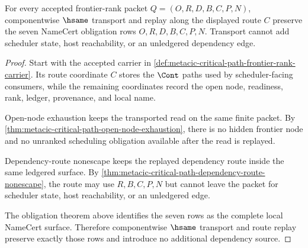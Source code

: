 \begin{theorem}
\label{thm:metacic-critical-path-frontier-rank-transport-stability}
For every accepted frontier-rank packet $Q=(O,R,D,B,C,P,N)$, componentwise $\hsame$ transport and replay along the displayed route $C$ preserve the seven NameCert obligation rows $O,R,D,B,C,P,N$. Transport cannot add scheduler state, host reachability, or an unledgered dependency edge.
\end{theorem}
\begin{proof}
Start with the accepted carrier in \autoref{def:metacic-critical-path-frontier-rank-carrier}. Its route coordinate $C$ stores the $\Cont$ paths used by scheduler-facing consumers, while the remaining coordinates record the open node, readiness, rank, ledger, provenance, and local name.

Open-node exhaustion keeps the transported read on the same finite packet. By \autoref{thm:metacic-critical-path-open-node-exhaustion}, there is no hidden frontier node and no unranked scheduling obligation available after the read is replayed.

Dependency-route nonescape keeps the replayed dependency route inside the same ledgered surface. By \autoref{thm:metacic-critical-path-dependency-route-nonescape}, the route may use $R,B,C,P,N$ but cannot leave the packet for scheduler state, host reachability, or an unledgered edge.

The obligation theorem above identifies the seven rows as the complete local NameCert surface. Therefore componentwise $\hsame$ transport and route replay preserve exactly those rows and introduce no additional dependency source.
\end{proof}

